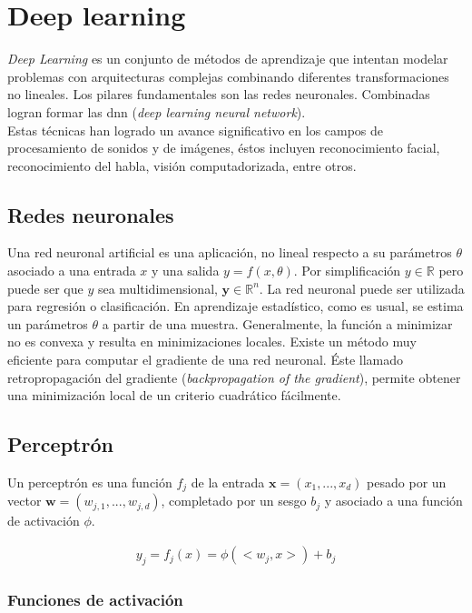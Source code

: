 \chapter{Deep learning} \label{ch:deep-learning}

\indent \textit{Deep Learning} es un conjunto de métodos de aprendizaje que intentan modelar problemas con
arquitecturas complejas combinando diferentes transformaciones no lineales. Los pilares fundamentales son las redes
neuronales. Combinadas logran formar las \acrshort{dnn} (\textit{deep learning neural network}). \\
\indent Estas técnicas han logrado un avance significativo en los campos de procesamiento de sonidos y de imágenes,
éstos incluyen reconocimiento facial, reconocimiento del habla, visión computadorizada, entre otros.

\section{Redes neuronales}

\indent Una red neuronal artificial es una aplicación, no lineal respecto a su parámetros $\theta$ asociado a una
entrada $x$ y una salida $y = f(x,\theta)$. Por simplificación $y \in \mathbb{R}$ pero puede ser que $y$ sea
multidimensional, $\textbf{y} \in \mathbb{R}^n$. La red neuronal puede ser utilizada para regresión o clasificación.
En aprendizaje estadístico, como es usual, se estima un parámetros $\theta$ a partir de una muestra. Generalmente,
la función a minimizar no es convexa y resulta en minimizaciones locales. Existe un método muy eficiente para
computar el gradiente de una red neuronal. Éste llamado retropropagación del gradiente (\textit{backpropagation of
the gradient}), permite obtener una minimización local de un criterio cuadrático fácilmente.

\section{Perceptrón}

\indent Un perceptrón es una función $f_j$ de la entrada $\mathbf{x} = (x_1, ...,x_d)$ pesado por un vector
$\mathbf{w} = (w_{j,1}, ..., w_{j,d})$, completado por un sesgo $b_j$ y asociado a una función de activación $\phi$.

\begin{align}
  y_j = f_j(x) = \phi(<w_j,x>) + b_j
\end{align}

\subsection*{Funciones de activación}

